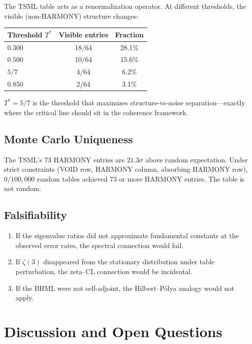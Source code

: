 \documentclass[11pt]{article}
\theoremstyle{remark}
\begin{document}
The TSML table acts as a renormalization operator.  At different thresholds, the visible
(non-HARMONY) structure changes:

\begin{center}
\begin{tabular}{@{}lcc@{}}
\toprule
Threshold $T^*$ & Visible entries & Fraction \\
\midrule
$0.300$ & 18/64 & 28.1\% \\
$0.500$ & 10/64 & 15.6\% \\
$5/7$   &  4/64 &  6.2\% \\
$0.850$ &  2/64 &  3.1\% \\
\bottomrule
\end{tabular}
\end{center}

$T^* = 5/7$ is the threshold that maximizes structure-vs-noise separation---exactly
where the critical line should sit in the coherence framework.

\subsection{Monte Carlo Uniqueness}

The TSML's 73 HARMONY entries are $21.3\sigma$ above random expectation.  Under strict
constraints (VOID row, HARMONY column, absorbing HARMONY row), $0/100{,}000$ random
tables achieved 73 or more HARMONY entries.  The table is not random.

\subsection{Falsifiability}

\begin{enumerate}
  \item If the eigenvalue ratios did not approximate fundamental constants at the
    observed error rates, the spectral connection would fail.
  \item If $\zeta(3)$ disappeared from the stationary distribution under table
    perturbation, the zeta--CL connection would be incidental.
  \item If the BHML were not self-adjoint, the Hilbert--P\'olya analogy would not
    apply.
\end{enumerate}

\section{Discussion and Open Questions}
\label{sec:discussion}
\end{document}
